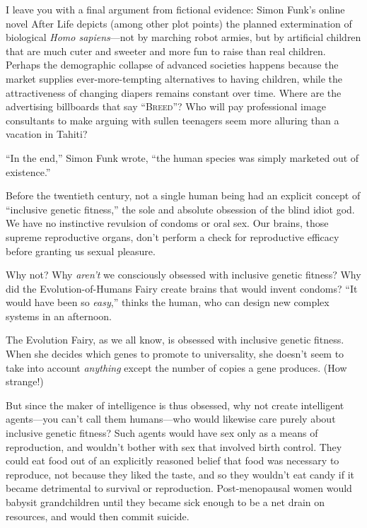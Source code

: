 {
 I leave you with a final argument from fictional evidence: Simon
Funk's online novel After Life depicts (among other
plot points) the planned extermination of biological \textit{Homo
sapiens}{}---not by marching robot armies, but by artificial children
that are much cuter and sweeter and more fun to raise than real
children. Perhaps the demographic collapse of advanced societies
happens because the market supplies ever-more-tempting alternatives to
having children, while the attractiveness of changing diapers remains
constant over time. Where are the advertising billboards that say
``\textsc{Breed}''? Who will pay professional
image consultants to make arguing with sullen teenagers seem more
alluring than a vacation in Tahiti?}

{
 ``In the end,'' Simon Funk
wrote, ``the human species was simply marketed out of
existence.''}

\myendsectiontext


{
 Before the twentieth century, not a single human being had an
explicit concept of ``inclusive genetic
fitness,'' the sole and absolute obsession of the
blind idiot god. We have no instinctive revulsion of condoms or oral
sex. Our brains, those supreme reproductive organs,
don't perform a check for reproductive efficacy before
granting us sexual pleasure. }

{
 Why not? Why \textit{aren't} we consciously
obsessed with inclusive genetic fitness? Why did the
Evolution-of-Humans Fairy create brains that would invent condoms?
``It would have been so
\textit{easy},'' thinks the human, who can design new
complex systems in an afternoon.}

{
 The Evolution Fairy, as we all know, is obsessed with inclusive
genetic fitness. When she decides which genes to promote to
universality, she doesn't seem to take into account
\textit{anything} except the number of copies a gene produces. (How
strange!)}

{
 But since the maker of intelligence is thus obsessed, why not
create intelligent agents---you can't call them
humans---who would likewise care purely about inclusive genetic
fitness? Such agents would have sex only as a means of reproduction,
and wouldn't bother with sex that involved birth
control. They could eat food out of an explicitly reasoned belief that
food was necessary to reproduce, not because they liked the taste, and
so they wouldn't eat candy if it became detrimental to
survival or reproduction. Post-menopausal women would babysit
grandchildren until they became sick enough to be a net drain on
resources, and would then commit suicide.}

